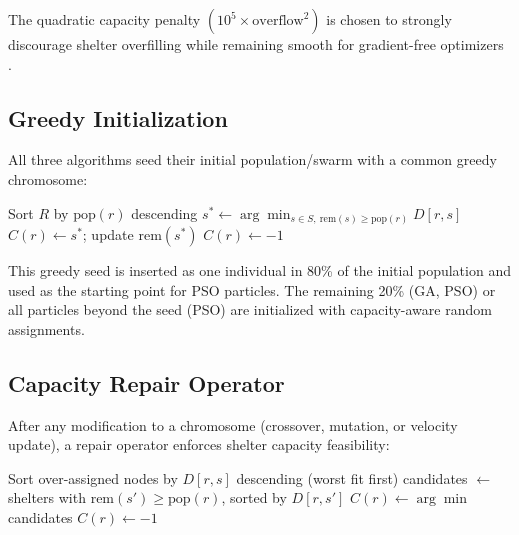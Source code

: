 \documentclass[journal]{IEEEtran}
\begin{document}
The quadratic capacity penalty $(10^5 \times \text{overflow}^2)$ is chosen to strongly
discourage shelter overfilling while remaining smooth for gradient-free optimizers
\cite{li2024evacuation}.

\subsection{Greedy Initialization}

All three algorithms seed their initial population/swarm with a common greedy chromosome:

\begin{algorithm}[H]
  \caption{Greedy Seed Chromosome Construction}
  \label{alg:greedy}
  \begin{algorithmic}[1]
    \STATE Sort $R$ by $\text{pop}(r)$ descending
      \STATE $s^* \leftarrow \arg\min_{s \in S,\ \text{rem}(s) \geq \text{pop}(r)} D[r, s]$
        \STATE $C(r) \leftarrow s^*$; update $\text{rem}(s^*)$
      \ELSE
        \STATE $C(r) \leftarrow -1$
      \ENDIF
    \ENDFOR
  \end{algorithmic}
\end{algorithm}

This greedy seed is inserted as one individual in 80\% of the initial population and used
as the starting point for PSO particles. The remaining 20\% (GA, PSO) or all particles
beyond the seed (PSO) are initialized with capacity-aware random assignments.

\subsection{Capacity Repair Operator}

After any modification to a chromosome (crossover, mutation, or velocity update), a repair
operator enforces shelter capacity feasibility:

\begin{algorithm}[H]
  \caption{Capacity Repair Operator}
  \label{alg:repair}
  \begin{algorithmic}[1]
      \STATE Sort over-assigned nodes by $D[r, s]$ descending (worst fit first)
        \STATE candidates $\leftarrow$ shelters with $\text{rem}(s') \geq \text{pop}(r)$,
               sorted by $D[r, s']$
          \STATE $C(r) \leftarrow \arg\min$ candidates
        \ELSE
          \STATE $C(r) \leftarrow -1$
        \ENDIF
      \ENDFOR
    \ENDFOR
  \end{algorithmic}
\end{algorithm}
\end{document}
